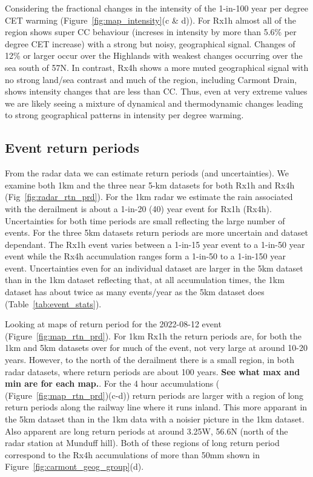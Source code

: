 \documentclass[11pt,a4paper]{article}
\begin{document}
Considering the fractional changes in the intensity of the 1-in-100 year per degree CET warming (Figure~\ref{fig:map_intensity}(c \& d)). For Rx1h almost all of the region shows super CC behaviour (increses in intensity by more than 5.6\% per degree CET increase) with a strong but noisy,  geographical signal.  Changes of 12\% or larger occur over the Highlands with weakest changes occurring over the sea south of 57N. In contrast, Rx4h shows a  more muted geographical signal with no strong land/sea contrast and much of the region, including Carmont Drain, shows intensity changes that are less than CC.  Thus, even at very extreme values we are likely seeing a mixture of dynamical and thermodynamic  changes leading to  strong geographical patterns in  intensity per degree warming.

\subsection{Event return periods}
From the radar data we can estimate return periods (and uncertainties). We examine both 1km and the three near 5-km datasets for both Rx1h and Rx4h (Fig~\ref{fig:radar_rtn_prd}). For the 1km radar we estimate the rain associated with the derailment is about a 1-in-20 (40) year event for Rx1h (Rx4h). Uncertainties for both time periods are small reflecting the large number of events. For the three 5km datasets return periods are more uncertain and dataset dependant. The Rx1h event varies between a 1-in-15 year event to a 1-in-50 year event while the Rx4h accumulation ranges form a 1-in-50 to a 1-in-150 year event. Uncertainties even for an individual dataset are larger in the 5km dataset than in the 1km dataset reflecting that, at all accumulation times, the 1km dataset has about twice as many events/year as the  5km dataset does (Table~\ref{tab:event_stats}).

Looking at maps of return period for the 2022-08-12 event (Figure~\ref{fig:map_rtn_prd}). For 1km Rx1h the return periods are, for both the 1km and 5km datasets over for much of the event, not very large at around 10-20 years. However,  to the north of the derailment there is a small region, in both radar datasets, where return periods are about 100 years.  \textbf{See what max and min are for each map.}.  For the 4 hour accumulations ( (Figure~\ref{fig:map_rtn_prd})(c-d)) return periods are larger with a region of long return periods along the railway line where it runs inland. This more apparant in the 5km dataset than in the 1km data with a noisier picture in the 1km dataset. Also apparent are long return periods at around 3.25W, 56.6N (north of the radar station at Munduff hill). Both of these regions of long return period correspond to the Rx4h accumulations of more than 50mm shown in Figure~\ref{fig:carmont_geog_group}(d). 
\end{document}
